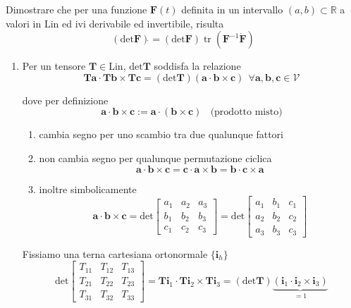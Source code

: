 \documentclass[10pt,a4paper,twoside]{book}
\begin{document}
Dimostrare che per una funzione $\mathbf{F} (t)$ definita in un intervallo $(a,b)\subset \mathbb{R}$ a valori in $\mathrm{Lin}$ ed ivi derivabile ed invertibile, risulta
\begin{equation*}
\boxed{(\mathrm{det}\mathbf{F} )\dot{} =(\mathrm{det}\mathbf{F} )\operatorname{tr}\left(\mathbf{F}^{-1}\dot{\mathbf{F}}\right)}
\end{equation*}
\begin{enumerate}
\item Per un tensore $\mathbf{T} \in \mathrm{Lin}$, $\mathrm{det}\mathbf{T}$ soddisfa la relazione\begin{equation*}
\mathbf{Ta} \cdotp \mathbf{Tb} \times \mathbf{Tc} =(\mathrm{det}\mathbf{T})(\mathbf{a} \cdotp \mathbf{b} \times \mathbf{c}) \ \ \forall \mathbf{a} ,\mathbf{b} ,\mathbf{c} \in \mathcal{V}
\end{equation*}

dove per definizione\begin{equation*}
\mathbf{a} \cdotp \mathbf{b} \times \mathbf{c} :=\mathbf{a} \cdotp (\mathbf{b} \times \mathbf{c}) \ \ \ \ \text{(prodotto misto)}
\end{equation*}
\begin{enumerate}
\item cambia segno per uno scambio tra due qualunque fattori
\item non cambia segno per qualunque permutazione ciclica\begin{equation*}
\mathbf{a} \cdotp \mathbf{b} \times \mathbf{c} =\mathbf{c} \cdotp \mathbf{a} \times \mathbf{b} =\mathbf{b} \cdotp \mathbf{c} \times \mathbf{a}
\end{equation*}
\item inoltre simbolicamente\begin{equation*}
\mathbf{a} \cdotp \mathbf{b} \times \mathbf{c} =\mathrm{det}\begin{bmatrix}
a_{1} & a_{2} & a_{3}\\
b_{1} & b_{2} & b_{3}\\
c_{1} & c_{2} & c_{3}
\end{bmatrix} =\mathrm{det}\begin{bmatrix}
a_{1} & b_{1} & c_{1}\\
a_{2} & b_{2} & c_{2}\\
a_{3} & b_{3} & c_{3}
\end{bmatrix}
\end{equation*}
\end{enumerate}

Fissiamo una terna cartesiana ortonormale $\{\mathbf{i}_{h}\}$\begin{equation*}
\mathrm{det}\begin{bmatrix}
T_{11} & T_{12} & T_{13}\\
T_{21} & T_{22} & T_{23}\\
T_{31} & T_{32} & T_{33}
\end{bmatrix} =\mathbf{Ti}_{1} \cdotp \mathbf{Ti}_{2} \times \mathbf{Ti}_{3} =(\mathrm{det}\mathbf{T})\underbrace{(\mathbf{i}_{1} \cdotp \mathbf{i}_{2} \times \mathbf{i}_{3})}_{=1}
\end{equation*}


\end{enumerate}
\end{document}
